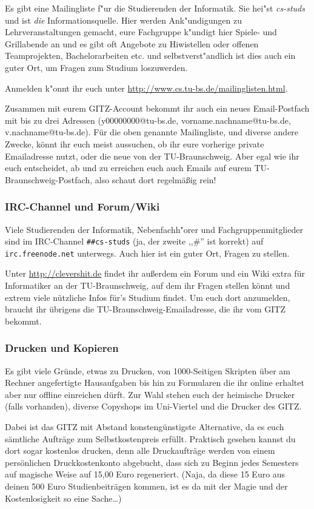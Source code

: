 Es gibt eine Mailingliste f"ur die Studierenden der Informatik.
Sie hei"st \emph{cs-studs} und ist \emph{die} Informationsquelle.
Hier werden Ank"undigungen zu Lehrveranstaltungen gemacht, eure
Fachgruppe k"undigt hier Spiele- und Grillabende an und es gibt
oft Angebote zu Hiwistellen oder offenen Teamprojekten,
Bachelorarbeiten etc. und selbstverst"andlich ist dies auch ein
guter Ort, um Fragen zum Studium loszuwerden.

Anmelden k"onnt ihr euch unter
\url{http://www.cs.tu-bs.de/mailinglisten.html}.

Zusammen mit eurem GITZ-Account bekommt ihr auch ein neues 
Email-Postfach mit bis zu drei Adressen (y00000000@tu-bs.de, 
vorname.nachname@tu-bs.de, v.nachname@tu-bs.de). Für die oben 
genannte Mailingliste, und diverse andere Zwecke, könnt ihr euch 
meist aussuchen, ob ihr eure vorherige private Emailadresse nutzt, 
oder die neue von der TU-Braunschweig. Aber egal wie ihr euch 
entscheidet, ab und zu erreichen euch auch Emails auf eurem 
TU-Braunschweig-Postfach, also schaut dort regelmäßig rein!

\subsubsection{IRC-Channel und Forum/Wiki}

Viele Studierenden der Informatik, Nebenfachh"orer und
Fachgruppenmitglieder sind im IRC-Channel \texttt{\#\#cs-studs}
(ja, der zweite ,,\#'' ist korrekt) auf \texttt{irc.freenode.net}
unterwegs. Auch hier ist ein guter Ort, Fragen zu stellen.

Unter \url{http://clevershit.de} findet ihr außerdem ein Forum und ein 
Wiki extra für Informatiker an der TU-Braunschweig, auf dem ihr Fragen 
stellen könnt und extrem viele nützliche Infos für's Studium findet. Um 
euch dort anzumelden, braucht ihr übrigens die TU-Braunschweig-Emailadresse, 
die ihr vom GITZ bekommt.

\subsubsection{Drucken und Kopieren}
Es gibt viele Gründe, etwas zu Drucken, von 1000-Seitigen Skripten über am Rechner angefertigte Hausaufgaben bis hin zu Formularen die ihr online erhaltet aber nur offline einreichen dürft. Zur Wahl stehen euch der heimische Drucker (falls vorhanden), diverse Copyshops im Uni-Viertel und die Drucker des GITZ.

Dabei ist das GITZ mit Abstand konstengünstigste Alternative, da es euch sämtliche Aufträge zum Selbstkostenpreis erfüllt. Praktisch gesehen kannst du dort sogar kostenlos drucken, denn alle Druckaufträge werden von einem persönlichen Druckkostenkonto abgebucht, dass sich zu Beginn jedes Semesters auf magische Weise auf 15,00 Euro regeneriert. (Naja, da diese 15 Euro aus deinen 500 Euro Studienbeiträgen kommen, ist es da mit der Magie und der Kostenlosigkeit so eine Sache\ldots)

